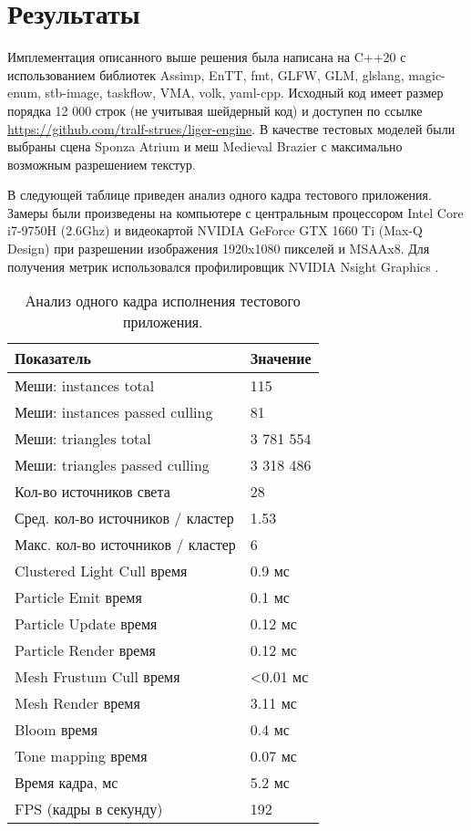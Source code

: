 \section{Результаты}
Имплементация описанного выше решения была написана на C++20 с использованием библиотек Assimp, EnTT, fmt, GLFW, GLM, glslang, magic-enum, stb-image, taskflow, VMA, volk, yaml-cpp. Исходный код имеет размер порядка 12 000 строк (не учитывая шейдерный код) и доступен по ссылке \url{https://github.com/tralf-strues/liger-engine}. В качестве тестовых моделей были выбраны сцена Sponza Atrium \cite{sponza_atrium} и меш Medieval Brazier \cite{medieval_brazier} с максимально возможным разрешением текстур.

В следующей таблице приведен анализ одного кадра тестового приложения. Замеры были произведены на компьютере с центральным процессором Intel Core i7-9750H (2.6Ghz) и видеокартой NVIDIA GeForce GTX 1660 Ti (Max-Q Design) при разрешении изображения 1920x1080 пикселей и MSAAx8. Для получения метрик использовался профилировщик NVIDIA Nsight Graphics \cite{nsight}.

\begin{table}[ht]
    \centering
    \begin{tabular}{ p{70mm} | p{30mm} }
    \textbf{Показатель} & \textbf{Значение} \\
    \hline
    \hline
    Меши: instances total & 115 \\
    Меши: instances passed culling & 81 \\
    Меши: triangles total & 3 781 554 \\
    Меши: triangles passed culling & 3 318 486 \\
    \hline
    Кол-во источников света & 28 \\
    Сред. кол-во источников / кластер & 1.53 \\
    Макс. кол-во источников / кластер & 6 \\
    \hline
    \hline
    Clustered Light Cull время & 0.9 мс \\
    \hline
    Particle Emit время & 0.1 мс \\
    Particle Update время & 0.12 мс \\
    Particle Render время & 0.12 мс \\
    \hline
    Mesh Frustum Cull время & <0.01 мс \\
    Mesh Render время & 3.11 мс \\
    \hline
    Bloom время & 0.4 мс \\
    Tone mapping время & 0.07 мс \\
    \hline
    \hline
    Время кадра, мс & 5.2 мс \\
    FPS (кадры в секунду) & 192 \\
    \end{tabular}
    \caption{Анализ одного кадра исполнения тестового приложения.}
    \label{tbl:frame_stats}
\end{table}


